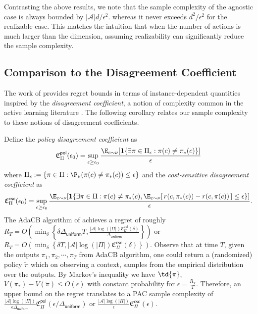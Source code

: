 \documentclass{article}
\newcommand{\mc}[1]{\mathcal{#1}}
\newcommand{\1}{\mathbf{1}}
\renewcommand{\v}{r} %
\begin{document}
\begin{remark}
Contrasting the above results, we note that the sample complexity of the agnostic case is always bounded by $|\mc{A}| d /\epsilon^2$.
whereas it never exceeds $d^2/\epsilon^2$ for the realizable case. 
This matches the intuition that when the number of actions is much larger than the dimension, assuming realizability can significantly reduce the sample complexity.
\end{remark}

\subsection{Comparison to the Disagreement Coefficient}

The work of \cite{foster2021instance} provides regret bounds in terms of instance-dependent quantities inspired by the \textit{disagreement coefficient}, a notion of complexity common in the active learning literature \cite{hanneke2014theory}.  
The following corollary relates our sample complexity to these notions of disagreement coefficients. 

Define the \emph{policy disagreement coefficient} as
\begin{align*}
    \mathfrak{C}_{\Pi}^{\mathsf{pol}}(\epsilon_0)=\sup_{\epsilon\geq \epsilon_0}\frac{\E_{c\sim\nu}[\1\{\exists\pi\in\Pi_\epsilon:\pi(c)\ne\pi_*(c)\}]}{\epsilon}
\end{align*}
where  $\Pi_\epsilon:=\{\pi\in\Pi:\P_\nu(\pi(c)\ne\pi_*(c))\leq\epsilon\}$
and the \emph{cost-sensitive disagreement coefficient} as
\begin{align*}
    \mathfrak{C}_{\Pi}^{\mathsf{csc}}(\epsilon_0)=\sup_{\epsilon\geq \epsilon_0}\frac{\E_{c\sim\nu}[\1\{\exists\pi\in\Pi:\pi(c)\ne\pi_*(c),\E_{c \sim \nu}[ \, \v(c,\pi_*(c)) - \v(c,\pi(c)) \, ]\leq \epsilon\}]}{\epsilon}.
\end{align*}
The \textsf{AdaCB} algorithm of \cite{foster2021instance} achieves a regret of roughly $R_T=O\left(\min_{\delta}\left\{\delta\Delta_{\mathsf{uniform}} T, \frac{|\mc{A}| \log( |\Pi|)\mathfrak{C}_{\Pi}^{\mathsf{pol}}(\delta)}{\Delta_{\mathsf{uniform}}}\right\}\right)$ or $R_T=O\left(\min_{\delta}\left\{\delta T, |\mc{A}| \log( |\Pi|)\mathfrak{C}_{\Pi}^{\mathsf{csc}}(\delta)\right\}\right)$. Observe that at time $T$, given the outputs $\pi_1,\pi_2,\cdots,\pi_T$ from \textsf{AdaCB} algorithm, one could return a  (randomized) policy $\tilde{\pi}$ which on observing a context, samples from the empirical distribution over the outputs. By Markov's inequality we have $\td{\pi}$, $V(\pi_{\ast}) - V(\tilde{\pi}) \leq O(\epsilon)$ with constant probability for $\epsilon=\frac{R_T}{T}$. Therefore, an upper bound on the regret translates to a PAC sample complexity of $\frac{|\mc{A}| \log( |\Pi|)}{\epsilon\Delta_{\mathsf{uniform}}}\mathfrak{C}_{\Pi}^{\mathsf{pol}}(\epsilon/\Delta_{\mathsf{uniform}})$ or $\frac{|\mc{A}| \log( |\Pi|)}{\epsilon}\mathfrak{C}_{\Pi}^{\mathsf{csc}}(\epsilon)$. 
\end{document}
